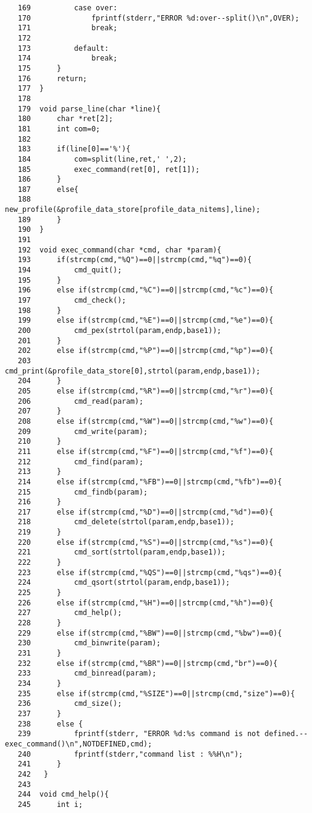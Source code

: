 \documentclass[a4j,11pt]{jarticle}
\begin{document}
{\begin{verbatim}
   169	        case over:
   170	            fprintf(stderr,"ERROR %d:over--split()\n",OVER);
   171	            break;
   172	        
   173	        default:
   174	            break;
   175	    }
   176	    return;
   177	}
   178	
   179	void parse_line(char *line){
   180	    char *ret[2];
   181	    int com=0;
   182	    
   183	    if(line[0]=='%'){
   184	        com=split(line,ret,' ',2);
   185	        exec_command(ret[0], ret[1]);
   186	    }
   187	    else{
   188	        new_profile(&profile_data_store[profile_data_nitems],line);
   189	    }
   190	}
   191	
   192	void exec_command(char *cmd, char *param){
   193	    if(strcmp(cmd,"%Q")==0||strcmp(cmd,"%q")==0){
   194	        cmd_quit();
   195	    }
   196	    else if(strcmp(cmd,"%C")==0||strcmp(cmd,"%c")==0){
   197	        cmd_check();
   198	    }
   199	    else if(strcmp(cmd,"%E")==0||strcmp(cmd,"%e")==0){
   200	        cmd_pex(strtol(param,endp,base1));
   201	    }
   202	    else if(strcmp(cmd,"%P")==0||strcmp(cmd,"%p")==0){
   203	        cmd_print(&profile_data_store[0],strtol(param,endp,base1));
   204	    }
   205	    else if(strcmp(cmd,"%R")==0||strcmp(cmd,"%r")==0){
   206	        cmd_read(param);
   207	    }
   208	    else if(strcmp(cmd,"%W")==0||strcmp(cmd,"%w")==0){
   209	        cmd_write(param);
   210	    }
   211	    else if(strcmp(cmd,"%F")==0||strcmp(cmd,"%f")==0){
   212	        cmd_find(param);
   213	    }
   214	    else if(strcmp(cmd,"%FB")==0||strcmp(cmd,"%fb")==0){
   215	        cmd_findb(param);
   216	    }
   217	    else if(strcmp(cmd,"%D")==0||strcmp(cmd,"%d")==0){
   218	        cmd_delete(strtol(param,endp,base1));
   219	    }
   220	    else if(strcmp(cmd,"%S")==0||strcmp(cmd,"%s")==0){
   221	        cmd_sort(strtol(param,endp,base1));
   222	    }
   223	    else if(strcmp(cmd,"%QS")==0||strcmp(cmd,"%qs")==0){
   224	        cmd_qsort(strtol(param,endp,base1));
   225	    }
   226	    else if(strcmp(cmd,"%H")==0||strcmp(cmd,"%h")==0){
   227	        cmd_help();
   228	    }
   229	    else if(strcmp(cmd,"%BW")==0||strcmp(cmd,"%bw")==0){
   230	        cmd_binwrite(param);
   231	    }
   232	    else if(strcmp(cmd,"%BR")==0||strcmp(cmd,"br")==0){
   233	        cmd_binread(param);
   234	    }
   235	    else if(strcmp(cmd,"%SIZE")==0||strcmp(cmd,"size")==0){
   236	        cmd_size();
   237	    }
   238	    else {
   239	        fprintf(stderr, "ERROR %d:%s command is not defined.--exec_command()\n",NOTDEFINED,cmd);
   240	        fprintf(stderr,"command list : %%H\n");
   241	    }
   242	 }
   243	
   244	void cmd_help(){
   245	    int i;

\end{verbatim}}
\end{document}
